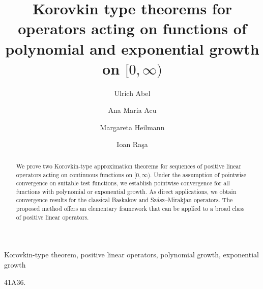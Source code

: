 \documentclass[preprint]{elsarticle}
\numberwithin{equation}{section}
\begin{document}
	
	
	\begin{frontmatter}
		
		\title{Korovkin type theorems for operators acting on functions of polynomial and exponential growth on $[0,\infty)$
		}
		
		
		\author[1]{Ulrich Abel} 
		\author[2]{Ana Maria Acu}
		\author[3]{Margareta Heilmann}
		\author[4]{Ioan Ra\c sa}
		
		
		\vspace{10cm}
		
		
		
		\address[1] {Technische Hochschule Mittelhessen, Department Mathematik, Naturwissenschaften und Datenverarbeitung, Friedberg, Germany, 
		e-mail: ulrich.abel@mnd.thm.de }
	\address[2]{Lucian Blaga University of Sibiu, Department of Mathematics and Informatics, Sibiu,  Romania, e-mail: anamaria.acu@ulbsibiu.ro}
	\address[3]{University of Wuppertal, School of Mathematics and Natural Sciences, Wuppertal,  Germany, e-mail: heilmann@math.uni-wuppertal.de}
	\address[4]{Technical University of Cluj-Napoca, Department of Mathematics, Cluj-Napoca, Romania,
		e-mail:  ioan.rasa@math.utcluj.ro }
		
		
		
		
		\begin{abstract} 	
			{We prove two Korovkin-type approximation theorems for sequences of positive linear operators acting on continuous functions on $[0,\infty)$. Under the assumption of pointwise convergence on suitable test functions, we establish pointwise convergence for all functions with polynomial or exponential growth.  As direct applications, we obtain convergence results for the classical Baskakov and Szász--Mirakjan operators. The proposed method offers an elementary framework that can be applied to a broad class of positive linear operators.				
			} 
		\end{abstract}
		
		\begin{keyword} Korovkin-type theorem, positive linear operators, polynomial growth, exponential growth
			
			\MSC[2020]  41A36.
		\end{keyword} 
		
	\end{frontmatter}
	
	
	
\end{document}
